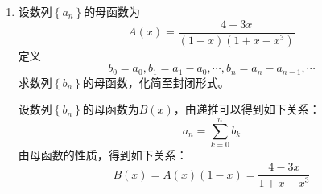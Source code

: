 \documentclass[a4paper]{article}
\begin{document}
\begin{enumerate}
\begin{solution}
  \end{solution}
  \item 设数列$\left\{a_n\right\}$的母函数为
  $$A(x)=\frac{4-3x}{(1-x)(1+x-x^3)}$$
  定义
  $$b_0=a_0,b_1=a_1-a_0,\cdots,b_n=a_n-a_{n-1},\cdots$$
  求数列$\left\{b_n\right\}$的母函数，化简至封闭形式。
  \begin{solution}
    设数列$\left\{b_n\right\}$的母函数为$B(x)$，由递推可以得到如下关系：
    $$a_n = \sum\limits_{k=0}^{n}b_k$$
    由母函数的性质，得到如下关系：
    $$B(x)=A(x)(1-x)=\frac{4-3x}{1+x-x^3}$$
  \end{solution}
\end{enumerate}
\end{document}
